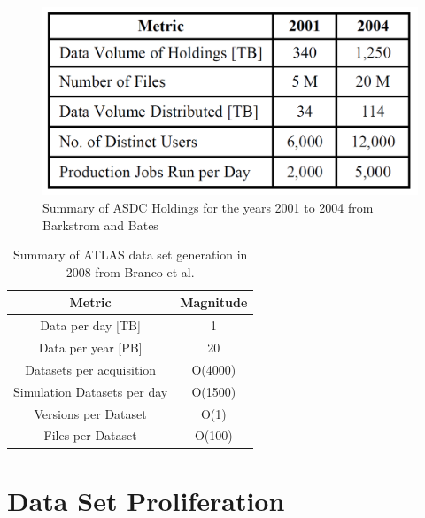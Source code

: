 \begin{figure}
	\centering
	\includegraphics[scale=0.40]{figures/ASDCHoldings.png}
	\caption{Summary of ASDC Holdings for the years 2001 to 2004 from Barkstrom and Bates \cite{Barkstrom_digitallibrary}}
	\label{table:ASDC}
\end{figure}

\begin{table}
	\centering
	\begin{tabular}{ | c | c |}
		\hline
		Metric & Magnitude \\
		\hline
		Data per day [TB] & 1 \\
		Data per year [PB] & 20 \\
		Datasets per acquisition & O(4000) \\
		Simulation Datasets per day & O(1500) \\
		Versions per Dataset & O(1) \\
		Files per Dataset & O(100) \\
		\hline
	\end{tabular}
	\caption{Summary of ATLAS data set generation in 2008 from Branco et al.\cite{Branco2008}}
	\label{table:Atlas}
\end{table}

\section{Data Set Proliferation}

